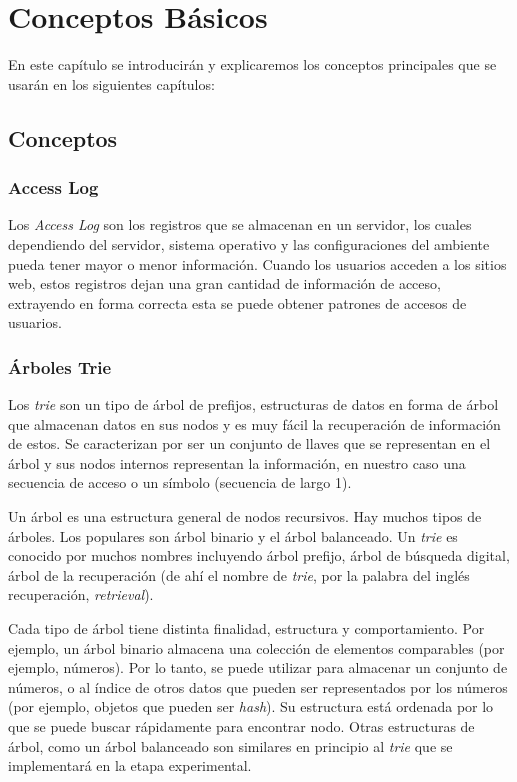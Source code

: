 \chapter[Conceptos Básicos]{Conceptos Básicos} \label{ch:Conceptos-Basicos}





En este capítulo se introducirán y explicaremos los conceptos principales que se usarán en los siguientes capítulos:


\section{Conceptos}

\subsection{Access Log}\label{concept-accesslog}

Los \emph{Access Log} son los registros que se almacenan en un servidor, los cuales dependiendo del servidor, sistema operativo y las configuraciones del ambiente pueda tener mayor o menor información. Cuando los usuarios acceden a los sitios web, estos registros dejan una gran cantidad de información de acceso, extrayendo en forma correcta esta  se puede obtener patrones de accesos de usuarios. 


\subsection{Árboles Trie} \label{concept-trie}

Los \emph{trie} son un tipo de árbol de prefijos, estructuras de datos en forma de árbol que almacenan datos en sus nodos y es muy fácil la recuperación de información de estos. Se caracterizan por ser un conjunto de llaves que se representan en el árbol y sus nodos internos representan la información, en nuestro caso una secuencia de acceso o un símbolo (secuencia de largo 1). 

Un árbol es una estructura general de nodos recursivos. Hay muchos tipos de árboles. Los populares son árbol binario y el árbol balanceado. Un \emph{trie} es conocido por muchos nombres incluyendo árbol prefijo, árbol de búsqueda digital, árbol de la recuperación (de ahí el nombre de \textquotedbl \emph{trie}\textquotedbl, por la palabra del inglés recuperación, \emph{retrieval}).

Cada tipo de árbol tiene distinta finalidad, estructura y comportamiento. Por ejemplo, un árbol binario almacena una colección de elementos comparables (por ejemplo, números). Por lo tanto, se puede utilizar para almacenar un conjunto de números, o al índice de otros datos que pueden ser representados por los números (por ejemplo, objetos que pueden ser \emph{hash}). Su estructura está ordenada por lo que se puede buscar rápidamente para encontrar nodo. Otras estructuras de árbol, como un árbol balanceado son similares en principio al \emph{trie} que se implementará en la etapa experimental.

